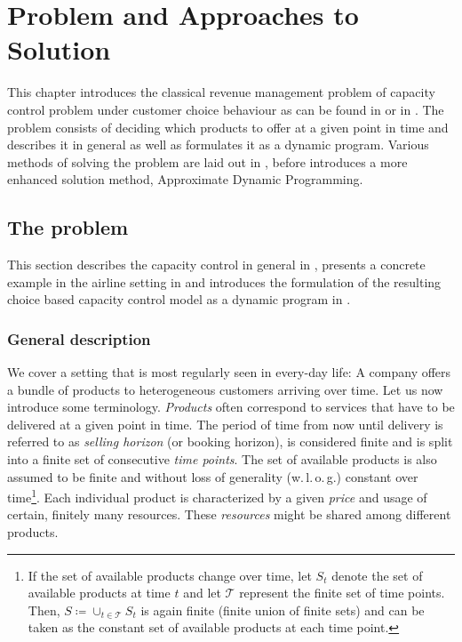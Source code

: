 
\chapter{Problem and Approaches to Solution}\label{ch:ProblemsMethods}

This chapter introduces the classical revenue management problem of capacity control problem under customer choice behaviour as can be found \eg in \cite{Koch.2017} or in \cite{Strauss.2018}. The problem consists of deciding which products to offer at a given point in time and  describes it in general as well as formulates it as a dynamic program. Various methods of solving the problem are laid out in , before  introduces a more enhanced solution method, Approximate Dynamic Programming.

\section{The problem}\label{s:Prob}

This section describes the capacity control in general in , presents a concrete example in the airline setting in  and introduces the formulation of the resulting choice based capacity control model as a dynamic program in . 

\subsection{General description}\label{ss:Prob:GenDesc}

We cover a setting that is most regularly seen in every-day life: A company offers a bundle of products to heterogeneous customers arriving over time. Let us now introduce some terminology. \emph{Products} often correspond to services that have to be delivered at a given point in time. The period of time from now until delivery is referred to as \emph{selling horizon} (or booking horizon), is considered finite and is split into a finite set of consecutive \emph{time points}. The set of available products is also assumed to be finite and without loss of generality (w.\,l.\,o.\,g.) constant over time\footnote{If the set of available products change over time, let $S_t$ denote the set of available products at time $t$ and let $\mathcal{T}$ represent the finite set of time points. Then, $S \coloneqq \cup_{t \in \mathcal{T}}S_t$ is again finite (finite union of finite sets) and can be taken as the constant set of available products at each time point.}. Each individual product is characterized by a given \emph{price} and usage of certain, finitely many resources. These \emph{resources} might be shared among different products. 

